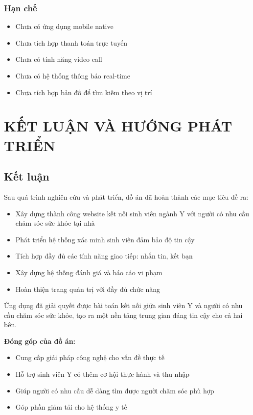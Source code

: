 \documentclass[12pt,a4paper]{report}
\begin{document}
\subsection{Hạn chế}

\begin{itemize}
    \item Chưa có ứng dụng mobile native
    \item Chưa tích hợp thanh toán trực tuyến
    \item Chưa có tính năng video call
    \item Chưa có hệ thống thông báo real-time
    \item Chưa tích hợp bản đồ để tìm kiếm theo vị trí
\end{itemize}

\newpage

\chapter{KẾT LUẬN VÀ HƯỚNG PHÁT TRIỂN}

\section{Kết luận}

Sau quá trình nghiên cứu và phát triển, đồ án đã hoàn thành các mục tiêu đề ra:

\begin{itemize}
    \item Xây dựng thành công website kết nối sinh viên ngành Y với người có nhu cầu chăm sóc sức khỏe tại nhà
    \item Phát triển hệ thống xác minh sinh viên đảm bảo độ tin cậy
    \item Tích hợp đầy đủ các tính năng giao tiếp: nhắn tin, kết bạn
    \item Xây dựng hệ thống đánh giá và báo cáo vi phạm
    \item Hoàn thiện trang quản trị với đầy đủ chức năng
\end{itemize}

Ứng dụng đã giải quyết được bài toán kết nối giữa sinh viên Y và người có nhu cầu chăm sóc sức khỏe, tạo ra một nền tảng trung gian đáng tin cậy cho cả hai bên.

\textbf{Đóng góp của đồ án:}
\begin{itemize}
    \item Cung cấp giải pháp công nghệ cho vấn đề thực tế
    \item Hỗ trợ sinh viên Y có thêm cơ hội thực hành và thu nhập
    \item Giúp người có nhu cầu dễ dàng tìm được người chăm sóc phù hợp
    \item Góp phần giảm tải cho hệ thống y tế
\end{itemize}
\end{document}
